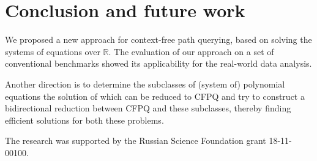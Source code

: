 \documentclass[sigconf]{acmart}
\begin{document}
\section{Conclusion and future work}

We proposed a new approach for context-free path querying, based on solving the systems of equations over $\mathbb{R}$.
The evaluation of our approach on a set of conventional benchmarks showed its applicability for the real-world data analysis.

Another direction is to determine the subclasses of (system of) polynomial equations the solution of which can be reduced to CFPQ and try to construct a bidirectional reduction between CFPQ and these subclasses, thereby finding efficient solutions for both these problems.



\begin{acks}
The research was supported by the Russian Science Foundation grant 18-11-00100.
\end{acks}


\balance

\end{document}
